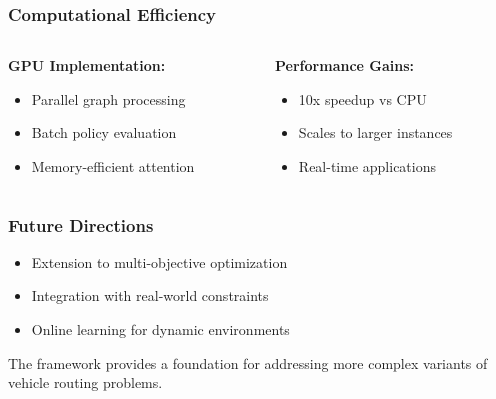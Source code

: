 \documentclass[aspectratio=169]{beamer}
\begin{document}
\begin{frame}
    \frametitle{Computational Efficiency}
    
    \begin{columns}
        \begin{column}{0.5\textwidth}
            \textbf{GPU Implementation:}
            \begin{itemize}
                \item Parallel graph processing
                \item Batch policy evaluation
                \item Memory-efficient attention
            \end{itemize}
        \end{column}
        \begin{column}{0.5\textwidth}
            \textbf{Performance Gains:}
            \begin{itemize}
                \item 10x speedup vs CPU
                \item Scales to larger instances
                \item Real-time applications
            \end{itemize}
        \end{column}
    \end{columns}
    
    
\end{frame}

\begin{frame}
    \frametitle{Future Directions}
    
    \begin{itemize}
        \item Extension to multi-objective optimization
        \item Integration with real-world constraints
        \item Online learning for dynamic environments
    \end{itemize}
    
    \bigskip
    
    The framework provides a foundation for addressing more complex variants of vehicle routing problems.
    
    
\end{frame}
\end{document}
